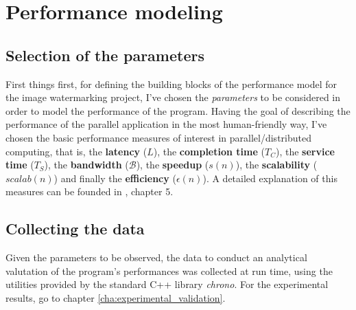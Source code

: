 \chapter{Performance modeling} %
\label{cha:performance_modeling}

    \section{Selection of the parameters} %
    \label{sec:parameters}
        First things first, for defining the building blocks of the performance model for the image
        watermarking project, I've chosen the \textit{parameters} to be considered in order to model the
        performance of the program. Having the goal of describing the performance of the parallel application in
        the most human-friendly way, I've chosen the basic performance measures of interest in
        parallel/distributed computing, that is, the \textbf{latency} ($L$), the \textbf{completion time}
        ($T_C$), the \textbf{service time} ($T_S$), the \textbf{bandwidth} ($\mathcal{B}$), the \textbf{speedup}
        ($s(n)$), the \textbf{scalability} ($\mathit{scalab}(n)$) and finally the \textbf{efficiency}
        ($\epsilon(n)$). A detailed explanation of this measures can be founded in \cite{DSPM}, chapter 5.

    \section{Collecting the data} %
    \label{sec:model_s_usage}
        Given the parameters to be observed, the data to conduct an analytical valutation of the program's
        performances was collected at run time, using the utilities provided by the standard C++ library
        \textit{chrono}. For the experimental results, go to chapter \ref{cha:experimental_validation}.

